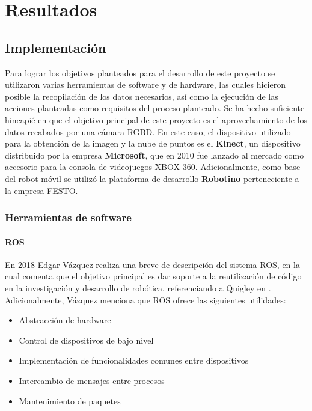 \chapter{Resultados}
    \section{Implementación}
    Para lograr los objetivos planteados para el desarrollo de este proyecto se utilizaron varias herramientas de software y de hardware, las cuales hicieron posible la recopilación de los datos necesarios, así como la ejecución de las acciones planteadas como requisitos del proceso planteado.
    Se ha hecho suficiente hincapié en que el objetivo principal de este proyecto es el aprovechamiento de los datos recabados por una cámara RGBD. En este caso, el dispositivo utilizado para la obtención de la imagen y la nube de puntos es el \textbf{Kinect}, un dispositivo distribuido por la empresa \textbf{Microsoft}, que en 2010 fue lanzado al mercado como accesorio para la consola de videojuegos XBOX 360. Adicionalmente, como base del robot móvil se utilizó la plataforma de desarrollo \textbf{Robotino} perteneciente a la empresa FESTO.

    
        \subsection{Herramientas de software}
            \subsubsection{ROS}
            En 2018 Edgar Vázquez realiza una breve de descripción del sistema ROS, en la cual comenta que el objetivo principal es dar soporte a la reutilización de código en la investigación y desarrollo de robótica, referenciando a Quigley en \cite{quigley_ROS}. Adicionalmente, Vázquez menciona que ROS ofrece las siguientes utilidades:
            \begin{itemize}
                \item Abstracción de hardware
                \item Control de dispositivos de bajo nivel
                \item Implementación de funcionalidades comunes entre dispositivos
                \item Intercambio de mensajes entre procesos
                \item Mantenimiento de paquetes
            \end{itemize}

